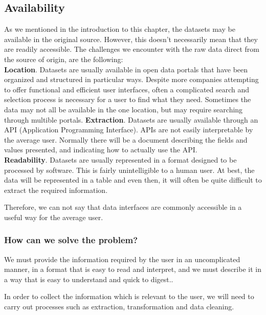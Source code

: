 \subsection{Availability}
    
As we mentioned in the introduction to this chapter, the datasets may be available in the original source. However, this doesn't necessarily
mean that they are readily accessible.
The challenges we encounter with the raw data direct from the source of origin, are the following: \\   
 
\textbf{Location}. Datasets are usually available in open data portals that have been organized and structured in particular ways.
Despite more companies attempting to offer functional and efficient user interfaces, often a complicated search and selection process is necessary for a user to find what they need. Sometimes the data may not all be available in the one location, but may require searching through multible portals.
\textbf{Extraction}. Datasets are usually available through an API (Application Programming Interface). APIs are not easily interpretable by the average user. Normally there will be a document describing the fields and values presented, and indicating how to actually use the API. \\

\textbf{Readability}. Datasets are usually represented in a format designed to be processed by software. This is fairly unintelligible to a human user. At best,
the data will be represented in a table and even then, it will often be quite difficult to extract the required information.

Therefore, we can not say that data interfaces are commonly accessible in a useful way for the average user. \\

\subsubsection{How can we solve the problem?} 

We must provide the information required by the user in an uncomplicated manner, in a format that is easy to read and interpret, and we must describe it in a way that is easy to understand and quick to digest..

In order to collect the information which is relevant to the user, we will need to carry out processes such as extraction, transformation and
data cleaning.
 
